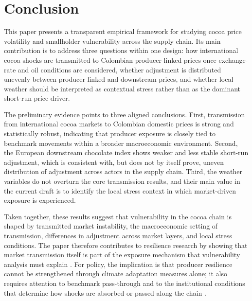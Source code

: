 \documentclass[11pt]{article}
\begin{document}
\section{Conclusion}

This paper presents a transparent empirical framework for studying cocoa price volatility and smallholder vulnerability across the supply chain. Its main contribution is to address three questions within one design: how international cocoa shocks are transmitted to Colombian producer-linked prices once exchange-rate and oil conditions are considered, whether adjustment is distributed unevenly between producer-linked and downstream prices, and whether local weather should be interpreted as contextual stress rather than as the dominant short-run price driver.

The preliminary evidence points to three aligned conclusions. First, transmission from international cocoa markets to Colombian domestic prices is strong and statistically robust, indicating that producer exposure is closely tied to benchmark movements within a broader macroeconomic environment. Second, the European downstream chocolate index shows weaker and less stable short-run adjustment, which is consistent with, but does not by itself prove, uneven distribution of adjustment across actors in the supply chain. Third, the weather variables do not overturn the core transmission results, and their main value in the current draft is to identify the local stress context in which market-driven exposure is experienced.

Taken together, these results suggest that vulnerability in the cocoa chain is shaped by transmitted market instability, the macroeconomic setting of transmission, differences in adjustment across market layers, and local stress conditions. The paper therefore contributes to resilience research by showing that market transmission itself is part of the exposure mechanism that vulnerability analysis must explain \citep{Turner2003,Adger2006}. For policy, the implication is that producer resilience cannot be strengthened through climate adaptation measures alone; it also requires attention to benchmark pass-through and to the institutional conditions that determine how shocks are absorbed or passed along the chain \citep{Gereffi2005,Merkle2021}.



\end{document}
